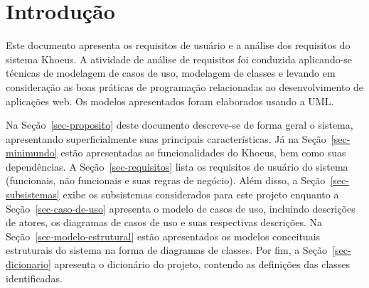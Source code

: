 \chapter{Introdução}
\label{sec-intro}


Este documento apresenta os requisitos de usuário e a análise dos requisitos do sistema Khoeus. A atividade de análise de requisitos foi conduzida aplicando-se técnicas de modelagem de casos de uso, modelagem de classes e levando em consideração as boas práticas de programação relacionadas ao desenvolvimento de aplicações web. Os modelos apresentados foram elaborados usando a UML.

Na Seção~\ref{sec-proposito} deste documento descreve-se de forma geral o sistema, apresentando superficialmente suas principais características. Já na Seção~\ref{sec-minimundo} estão apresentadas as funcionalidades do Khoeus, bem como suas dependências. A Seção~\ref{sec-requisitos} lista os requisitos de usuário do sistema (funcionais, não funcionais e suas regras de negócio). Além disso, a Seção~\ref{sec-subsistemas} exibe os subsistemas considerados para este projeto enquanto a Seção~\ref{sec-caso-de-uso} apresenta o modelo de casos de uso, incluindo descrições de atores, os diagramas de casos de uso e suas respectivas descrições. Na Seção~\ref{sec-modelo-estrutural} estão apresentados os modelos conceituais estruturais do sistema na forma de diagramas de classes. Por fim, a Seção~\ref{sec-dicionario} apresenta o  dicionário do projeto, contendo as definições das classes identificadas.
